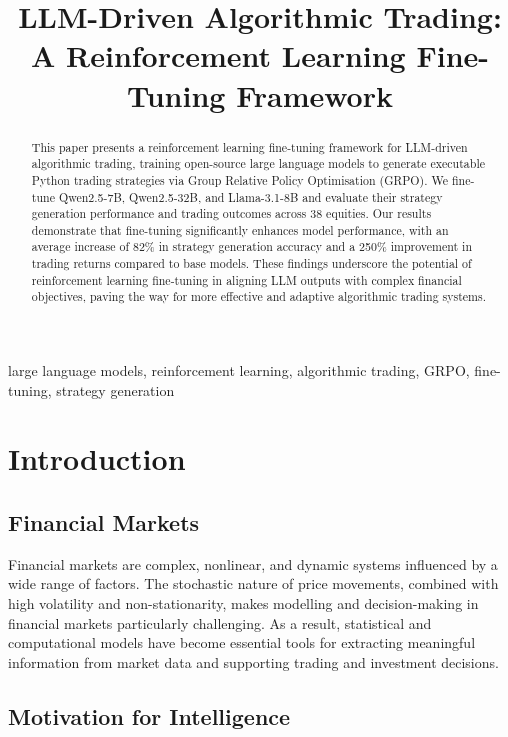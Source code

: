 \documentclass[conference]{IEEEtran}
\title{LLM-Driven Algorithmic Trading: A Reinforcement Learning Fine-Tuning Framework}
\author{
  \IEEEauthorblockN{Adham Helmy}
  \IEEEauthorblockA{Department of Computer Science \\
  Supervisors: Prof.\ Mohamed Ashour \& Prof.\ Ayman El Badawy}
}
\begin{document}
\maketitle

\begin{abstract}
This paper presents a reinforcement learning fine-tuning framework for LLM-driven algorithmic
trading, training open-source large language models to generate executable Python trading
strategies via Group Relative Policy Optimisation (GRPO).
We fine-tune Qwen2.5-7B, Qwen2.5-32B, and Llama-3.1-8B and evaluate their strategy generation
performance and trading outcomes across 38 equities.
Our results demonstrate that fine-tuning significantly enhances model performance,
with an average increase of 82\% in strategy generation accuracy and a 250\% improvement in trading returns compared to base models.
These findings underscore the potential of reinforcement learning fine-tuning in aligning LLM outputs with complex financial objectives,
paving the way for more effective and adaptive algorithmic trading systems.
\end{abstract}

\begin{IEEEkeywords}
large language models, reinforcement learning, algorithmic trading, GRPO, fine-tuning, strategy generation
\end{IEEEkeywords}

\section{Introduction}
\label{ch:intro}

\subsection{Financial Markets}
\label{sec:fin-markets}

Financial markets are complex, nonlinear, and dynamic systems influenced by a wide range of factors.
The stochastic nature of price movements, combined with high volatility and non-stationarity, makes
modelling and decision-making in financial markets particularly challenging. As a result, statistical
and computational models have become essential tools for extracting meaningful information from market
data and supporting trading and investment decisions.

\subsection{Motivation for Intelligence}
\label{sec:motivation}
\end{document}

